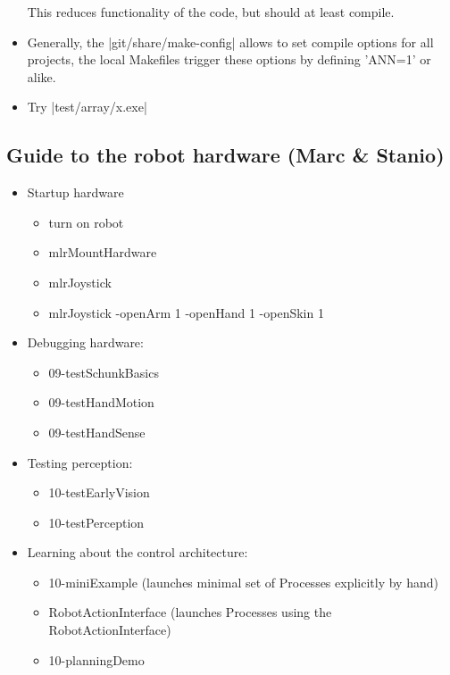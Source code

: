 \begin{itemize}
This reduces functionality of the code, but should at least compile.

\item Generally, the |git/share/make-config| allows to set compile
options for all projects, the local Makefiles trigger these options by
defining 'ANN=1' or alike.

\item Try |test/array/x.exe|
\end{itemize}

\subsection{Guide to the robot hardware (Marc \& Stanio)}

\begin{itemize}
\item Startup hardware
\begin{itemize}
\item turn on robot
\item mlrMountHardware
\item mlrJoystick
\item mlrJoystick -openArm 1 -openHand 1 -openSkin 1
\end{itemize}

\item Debugging hardware:
\begin{itemize}
\item 09-testSchunkBasics
\item 09-testHandMotion
\item 09-testHandSense
\end{itemize}

\item Testing perception:
\begin{itemize}
\item 10-testEarlyVision
\item 10-testPerception
\end{itemize}

\item Learning about the control architecture:
\begin{itemize}
\item 10-miniExample (launches minimal set of Processes explicitly by hand)
\item RobotActionInterface (launches Processes using the RobotActionInterface)
\item 10-planningDemo
\end{itemize}
\end{itemize}


